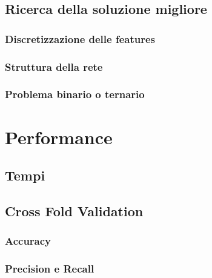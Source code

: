 \documentclass[hidelinks, 12pt]{article}
\begin{document}
\subsection{Ricerca della soluzione migliore}

\subsubsection{Discretizzazione delle features}


\subsubsection{Struttura della rete}


\subsubsection{Problema binario o ternario}




\clearpage



\section{Performance}

\subsection{Tempi}

\subsection{Cross Fold Validation}

\subsubsection{Accuracy}

\subsubsection{Precision e Recall}
\end{document}

